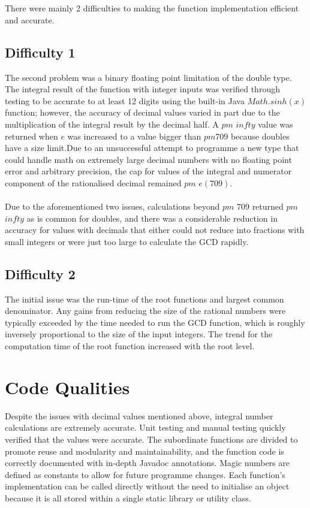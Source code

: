 \documentclass[letterpaper, 11pt]{report}
\begin{document}
\section*{}
\normalsize{There were mainly 2 difficulties to making the function implementation efficient and accurate. \\

\subsection*{Difficulty 1}
The second problem was a binary floating point limitation of the double type. The integral result of the function with integer inputs was verified through testing to be accurate to at least 12 digits using the built-in Java $Math.sinh(x)$ function; however, the accuracy of decimal values varied in part due to the multiplication of the integral result by the decimal half. A $pm$ $infty$ value was returned when $e$ was increased to a value bigger than $pm$709 because doubles have a size limit.Due to an unsuccessful attempt to programme a new type that could handle math on extremely large decimal numbers with no floating point error and arbitrary precision, the cap for values of the integral and numerator component of the rationalised decimal remained $pm$ $e(709)$. \\\\
Due to the aforementioned two issues, calculations beyond $pm$ 709 returned $pm$ $infty$ as is common for doubles, and there was a considerable reduction in accuracy for values with decimals that either could not reduce into fractions with small integers or were just too large to calculate the GCD rapidly.}
\subsection*{Difficulty 2}
The initial issue was the run-time of the root functions and largest common denominator. Any gains from reducing the size of the rational numbers were typically exceeded by the time needed to run the GCD function, which is roughly inversely proportional to the size of the input integers. The trend for the computation time of the root function increased with the root level. \\

\section*{{Code Qualities}}
Despite the issues with decimal values mentioned above, integral number calculations are extremely accurate. Unit testing and manual testing quickly verified that the values were accurate. The subordinate functions are divided to promote reuse and modularity and maintainability, and the function code is correctly documented with in-depth Javadoc annotations. Magic numbers are defined as constants to allow for future programme changes. Each function's implementation can be called directly without the need to initialise an object because it is all stored within a single static library or utility class.
\end{document}
